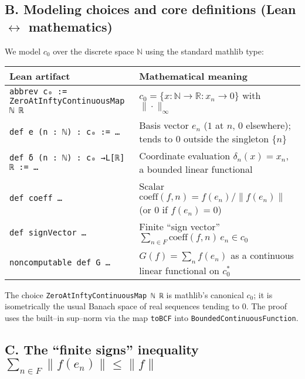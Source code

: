 \documentclass[11pt]{article}
\begin{document}
\subsection*{B. Modeling choices and core definitions (Lean $\leftrightarrow$ mathematics)}

We model $c_0$ over the discrete space $\mathbb N$ using the standard mathlib type:

\begin{center}
\begin{tabular}{p{} p{}}
\toprule
\textbf{Lean artifact} & \textbf{Mathematical meaning}\\
\midrule
\verb|abbrev c₀ := ZeroAtInftyContinuousMap ℕ ℝ|
& $c_0=\{x:\mathbb N\to\mathbb R : x_n\to 0\}$ with $\|\cdot\|_\infty$ \\[2pt]
\verb|def e (n : ℕ) : c₀ := …|
& Basis vector $e_n$ ($1$ at $n$, $0$ elsewhere); tends to $0$ outside the singleton $\{n\}$ \\[2pt]
\verb|def δ (n : ℕ) : c₀ →L[ℝ] ℝ := …|
& Coordinate evaluation $\delta_n(x)=x_n$, a bounded linear functional \\[2pt]
\verb|def coeff …|
& Scalar $\mathrm{coeff}(f,n) = f(e_n)/\|f(e_n)\|$ (or $0$ if $f(e_n)=0$) \\[2pt]
\verb|def signVector …|
& Finite ``sign vector'' $\sum_{n\in F}\mathrm{coeff}(f,n)\,e_n \in c_0$ \\[2pt]
\verb|noncomputable def G …|
& $G(f)=\sum_n f(e_n)$ as a continuous linear functional on $c_0^\ast$ \\
\bottomrule
\end{tabular}
\end{center}

The choice \verb|ZeroAtInftyContinuousMap ℕ ℝ| is mathlib's canonical $c_0$; it is isometrically the usual Banach space of real sequences tending to $0$. The proof uses the built--in sup--norm via the map \verb|toBCF| into \verb|BoundedContinuousFunction|.

\subsection*{C. The ``finite signs'' inequality $\sum_{n\in F}\|f(e_n)\|\le \|f\|$}
\end{document}
